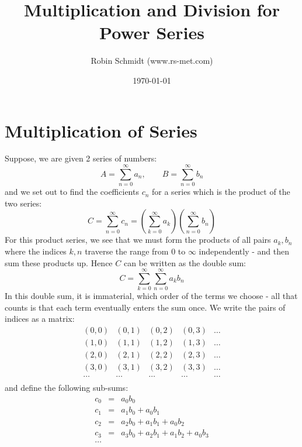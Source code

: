 \title{Multiplication and Division for Power Series}
\author{Robin Schmidt (www.rs-met.com)}
\date{\today}
\maketitle

\section{Multiplication of Series}
Suppose, we are given 2 series of numbers:
\begin{equation}
 A = \sum_{n=0}^{\infty} a_n, \qquad
 B = \sum_{n=0}^{\infty} b_n
\end{equation}
and we set out to find the coefficients $c_n$ for a series which is the product of the two series:
\begin{equation}
 \label{Eq:CauchyProduct}
 C = \sum_{n=0}^{\infty} c_n = (\sum_{k=0}^{\infty} a_k) (\sum_{n=0}^{\infty} b_n)
\end{equation}
For this product series, we see that we must form the products of all pairs $a_k, b_n$ where the indices $k, n$ traverse the range from $0$ to $\infty$ independently - and then sum these products up. Hence $C$ can be written as the double sum:
\begin{equation}
 C = \sum_{k=0}^{\infty} \sum_{n=0}^{\infty} a_k b_n
\end{equation}
In this double sum, it is immaterial, which order of the terms we choose - all that counts is that each term eventually enters the sum once. We write the pairs of indices as a matrix:
\begin{equation}
 \begin{array}{ccccc}
  (0,0)  & (0,1)  & (0,2)  & (0,3)  & \ldots \\
  (1,0)  & (1,1)  & (1,2)  & (1,3)  & \ldots \\
  (2,0)  & (2,1)  & (2,2)  & (2,3)  & \ldots \\
  (3,0)  & (3,1)  & (3,2)  & (3,3)  & \ldots \\    
  \ldots & \ldots & \ldots & \ldots & \ldots \\    
 \end{array}
\end{equation}
and define the following sub-sums:
\begin{equation}
 \label{Eq:ProductCoeffsWrittenOut}
 \begin{array}{ccl}
   c_0  & = & a_0 b_0  \\ 
   c_1  & = & a_1 b_0 + a_0 b_1 \\ 
   c_2  & = & a_2 b_0 + a_1 b_1 + a_0 b_2 \\ 
   c_3  & = & a_3 b_0 + a_2 b_1 + a_1 b_2 + a_0 b_3 \\ 
   \ldots
 \end{array}
\end{equation}
